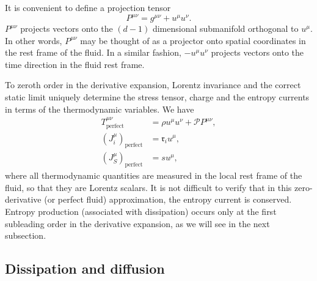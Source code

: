 \documentclass[12pt]{article}
\newcommand{\ploc}{\mathcal{P}}
\newcommand{\rl}{\mathfrak{r}}
\newcommand{\perf}{_\text{perfect}}
\begin{document}
It is convenient to define a projection tensor
%
\begin{equation}\label{proj:eq}
  P^{\mu\nu} = g^{\mu\nu} + u^\mu u^\nu.
\end{equation}
%
$P^{\mu\nu}$ projects vectors onto the $(d-1)$ dimensional submanifold orthogonal to $u^\mu$. In other words, $P^{\mu\nu}$ may be thought of as a projector onto spatial coordinates in the rest frame of the fluid. In a similar fashion, $- u^\mu u^\nu$ projects vectors onto the time direction in the fluid rest frame.

To zeroth order in the derivative expansion, Lorentz invariance and the correct static limit uniquely determine the stress tensor, charge and the entropy currents in terms of the thermodynamic variables. We have
%
\begin{equation}\label{currents:eq}
\begin{split}
  T^{\mu\nu}\perf& = \rho u^\mu u^\nu + \ploc P^{\mu\nu}, \\
  (J^\mu_i)\perf&=\rl_iu^\mu, \\
  (J^\mu_S)\perf&=s u^\mu,
\end{split}
\end{equation}
%
where all thermodynamic quantities are measured in the local rest frame of the fluid, so that they are Lorentz scalars. It is not difficult to verify that in this zero-derivative (or perfect fluid) approximation, the entropy current is conserved. Entropy production (associated with dissipation) occurs only at the first subleading order in the derivative expansion, as we will see in the next subsection.

\subsection{Dissipation and diffusion}\label{sec:visc}
\end{document}
